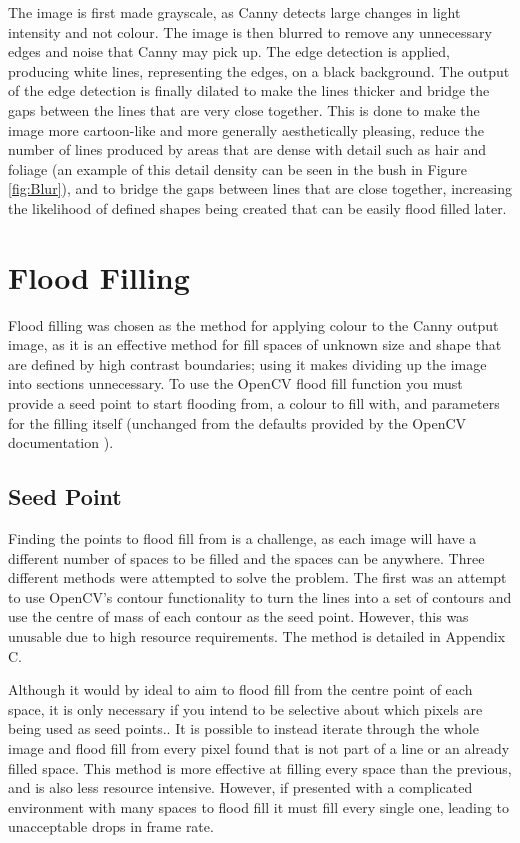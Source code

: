 The image is first made grayscale, as Canny detects large changes in light intensity and not colour. The image is then blurred to remove any unnecessary edges and noise that Canny may pick up. The edge detection is applied, producing white lines, representing the edges, on a black background. The output of the edge detection is finally dilated to make the lines thicker and bridge the gaps between the lines that are very close together. This is done to make the image more cartoon-like and more generally aesthetically pleasing, reduce the number of lines produced by areas that are dense with detail such as hair and foliage (an example of this detail density can be seen in the bush in Figure \ref{fig:Blur}), and to bridge the gaps between lines that are close together, increasing the likelihood of defined shapes being created that can be easily flood filled later.

\section{Flood Filling}

Flood filling was chosen as the method for applying colour to the Canny output image, as it is an effective method for fill spaces of unknown size and shape that are defined by high contrast boundaries; using it makes dividing up the image into sections unnecessary. To use the OpenCV flood fill function you must provide a seed point to start flooding from, a colour to fill with, and parameters for the filling itself (unchanged from the defaults provided by the OpenCV documentation \cite{opencvffilldemo}).

\subsection{Seed Point}

Finding the points to flood fill from is a challenge, as each image will have a different number of spaces to be filled and the spaces can be anywhere. Three different methods were attempted to solve the problem. The first was an attempt to use OpenCV's contour functionality to turn the lines into a set of contours and use the centre of mass of each contour as the seed point. However, this was unusable due to high resource requirements. The method is detailed in Appendix C.

Although it would by ideal to aim to flood fill from the centre point of each space, it is only necessary if you intend to be selective about which pixels are being used as seed points.. It is possible to instead iterate through the whole image and flood fill from every pixel found that is not part of a line or an already filled space. This method is more effective at filling every space than the previous, and is also less resource intensive. However, if presented with a complicated environment with many spaces to flood fill it must fill every single one, leading to unacceptable drops in frame rate.

